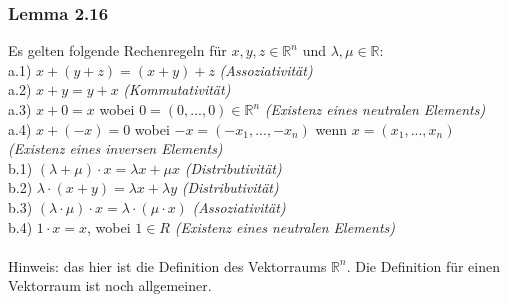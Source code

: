 \documentclass{article}
\begin{document}
\subsubsection*{Lemma 2.16}
Es gelten folgende Rechenregeln für $x,y,z \in \mathbb{R}^n$ und $\lambda, \mu \in \mathbb{R}$: \\
a.1) $x+(y+z) = (x+y)+z$ \textit{(Assoziativität)}\\ 
a.2) $x+y = y+x$ \textit{(Kommutativität)}\\
a.3) $x+0 = x$ wobei $0=(0, ..., 0) \in \mathbb{R}^n$ \textit{(Existenz eines neutralen Elements)}\\
a.4) $x+(-x) = 0$ wobei $-x=(-x_1, ..., -x_n)$ wenn $x=(x_1, ..., x_n)$ \textit{(Existenz eines inversen Elements)}\\
b.1) $(\lambda + \mu) \cdot x = \lambda x + \mu x$ \textit{(Distributivität)}\\
b.2) $\lambda \cdot (x+y) = \lambda x + \lambda y$ \textit{(Distributivität)}\\
b.3) $(\lambda \cdot \mu) \cdot x = \lambda \cdot (\mu \cdot x)$ \textit{(Assoziativität)}\\
b.4) $1 \cdot x = x$, wobei $1 \in R$ \textit{(Existenz eines neutralen Elements)}\\
\\
Hinweis: das hier ist die Definition des Vektorraums $\mathbb{R}^n$. Die Definition für einen Vektorraum ist noch allgemeiner. \\
\\
\end{document}

